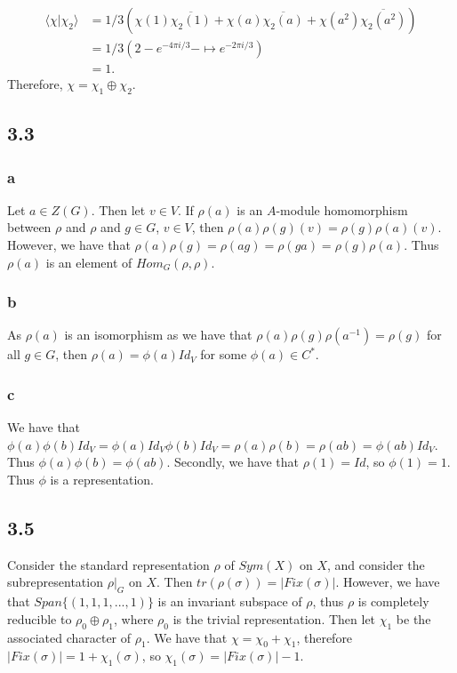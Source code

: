 \documentclass[]{article}
\begin{document}
\begin{align*}
	\langle \chi | \chi_2 \rangle &= 1/3 \left( \chi(1)\overline{\chi_2(1)} +   \chi(a)\overline{\chi_2(a)} + \chi(a^2)\overline{\chi_2(a^2)}   \right) \\
	&= 1/3(2 -e^{-4 \pi i/3} - \mapsto e^{-2 \pi i/3}) \\
	&= 1.
\end{align*}
Therefore, $\chi = \chi_1 \oplus \chi_2$.

\subsection*{3.3}
\subsubsection*{a}
Let $a \in Z(G)$. Then let $v \in V$. If $\rho(a)$ is an $A$-module homomorphism between $\rho$ and $\rho$ and $g \in G$, $v \in V$, then $\rho(a) \rho(g)(v) = \rho(g) \rho(a) (v)$. However, we have that $\rho(a) \rho(g) = \rho(ag) = \rho(ga) = \rho(g) \rho(a)$. Thus $\rho(a)$ is an element of $Hom_G(\rho, \rho)$.

\subsubsection*{b}
As $\rho(a)$ is an isomorphism as we have that $\rho(a) \rho(g) \rho(a^{-1}) = \rho(g)$ for all $g \in G$, then $\rho(a) = \phi(a) Id_V$ for some $\phi(a) \in C^*$. 
\subsubsection*{c}
We have that $\phi(a) \phi(b) Id_V = \phi(a) Id_V \phi(b) Id_V = \rho(a) \rho(b) = \rho(ab) = \phi(ab) Id_V$. Thus $\phi(a) \phi(b) = \phi(ab)$. Secondly, we have that $\rho(1) = Id$, so $\phi(1) = 1$. Thus $\phi$ is a representation. 


\subsection*{3.5}
Consider the standard representation $\rho$ of $Sym(X)$ on $X$, and consider the subrepresentation $\rho |_G$ on $X$. Then $tr(\rho(\sigma)) = |Fix(\sigma)|$. However, we have that $Span\lbrace (1, 1, 1, ..., 1) \rbrace$ is an invariant subspace of $\rho$, thus $\rho$ is completely reducible to $\rho_0 \oplus \rho_1$, where $\rho_0$ is the trivial representation. Then let $\chi_1$ be the associated character of $\rho_1$. We have that $\chi = \chi_0 + \chi_1$, therefore $|Fix(\sigma)| = 1 + \chi_1(\sigma)$, so $\chi_1(\sigma) = |Fix(\sigma)| - 1$. 
\end{document}
